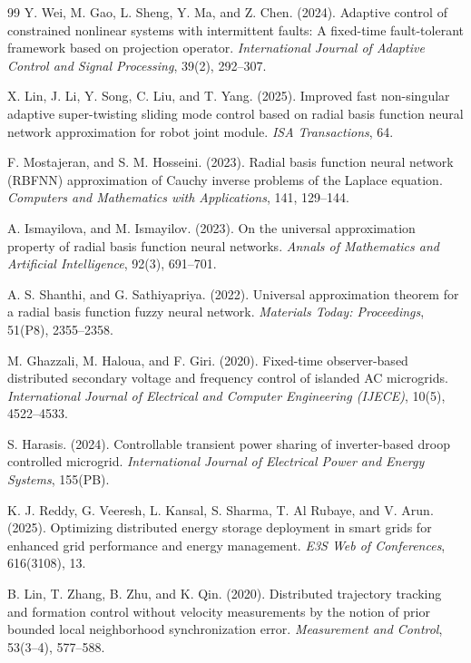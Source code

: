 \documentclass[]{interact}
\theoremstyle{plain}%
\theoremstyle{definition}
\theoremstyle{remark}
\begin{document}
\begin{thebibliography}{99}
Y. Wei, M. Gao, L. Sheng, Y. Ma, and Z. Chen. (2024). Adaptive control of constrained nonlinear systems with intermittent faults: A fixed-time fault-tolerant framework based on projection operator. \emph{International Journal of Adaptive Control and Signal Processing}, 39(2), 292–307.

X. Lin, J. Li, Y. Song, C. Liu, and T. Yang. (2025). Improved fast non-singular adaptive super-twisting sliding mode control based on radial basis function neural network approximation for robot joint module. \emph{ISA Transactions}, 64.

F. Mostajeran, and S. M. Hosseini. (2023). Radial basis function neural network (RBFNN) approximation of Cauchy inverse problems of the Laplace equation. \emph{Computers and Mathematics with Applications}, 141, 129–144.

A. Ismayilova, and M. Ismayilov. (2023). On the universal approximation property of radial basis function neural networks. \emph{Annals of Mathematics and Artificial Intelligence}, 92(3), 691–701.

A. S. Shanthi, and G. Sathiyapriya. (2022). Universal approximation theorem for a radial basis function fuzzy neural network. \emph{Materials Today: Proceedings}, 51(P8), 2355–2358.

M. Ghazzali, M. Haloua, and F. Giri. (2020). Fixed-time observer-based distributed secondary voltage and frequency control of islanded AC microgrids. \emph{International Journal of Electrical and Computer Engineering (IJECE)}, 10(5), 4522–4533.

S. Harasis. (2024). Controllable transient power sharing of inverter-based droop controlled microgrid. \emph{International Journal of Electrical Power and Energy Systems}, 155(PB).

K. J. Reddy, G. Veeresh, L. Kansal, S. Sharma, T. Al Rubaye, and V. Arun. (2025). Optimizing distributed energy storage deployment in smart grids for enhanced grid performance and energy management. \emph{E3S Web of Conferences}, 616(3108), 13.

B. Lin, T. Zhang, B. Zhu, and K. Qin. (2020). Distributed trajectory tracking and formation control without velocity measurements by the notion of prior bounded local neighborhood synchronization error. \emph{Measurement and Control}, 53(3–4), 577–588.


\end{thebibliography}
\end{document}

